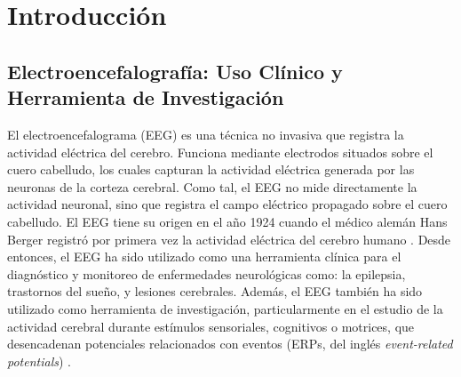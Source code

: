 %
\chapter{Introducción}
\label{sec:intro}






\section{Electroencefalografía: Uso Clínico y Herramienta de Investigación}
\label{sec:intro:eeg}

El electroencefalograma (EEG) es una técnica no invasiva que registra la actividad eléctrica del cerebro. Funciona mediante electrodos situados sobre el cuero cabelludo, los cuales capturan la actividad eléctrica generada por las neuronas de la corteza cerebral. Como tal, el EEG no mide directamente la actividad neuronal, sino que registra el campo eléctrico propagado sobre el cuero cabelludo. El EEG tiene su origen en el año 1924 cuando el médico alemán Hans Berger registró por primera vez la actividad eléctrica del cerebro humano \cite{bergerUeberElektrenkephalogrammMenschen1929}. Desde entonces, el EEG ha sido utilizado como una herramienta clínica para el diagnóstico y monitoreo de enfermedades neurológicas como: la epilepsia, trastornos del sueño, y lesiones cerebrales. \cite{niedermeyerElectroencephalographyBasicPrinciples2005} Además, el EEG también ha sido utilizado como herramienta de investigación, particularmente en el estudio de la actividad cerebral durante estímulos sensoriales, cognitivos o motrices, que desencadenan potenciales relacionados con eventos (ERPs, del inglés \emph{event-related potentials}) \cite{luckIntroductionEventrelatedPotential2014}.

